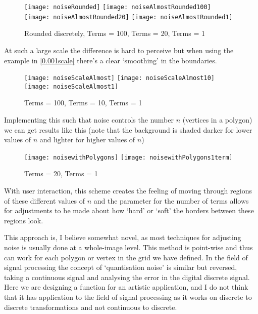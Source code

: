 \begin{figure}[H]
\centering
\texttt{[image: noiseRounded]}
\hspace{0.2cm}
\texttt{[image: noiseAlmostRounded100]}
\hspace{0.2cm}
\texttt{[image: noiseAlmostRounded20]}
\hspace{0.2cm}
\texttt{[image: noiseAlmostRounded1]}
\caption{Rounded discretely, Terms = 100, Terms = 20, Terms = 1}
\end{figure}

At such a large scale the difference is hard to perceive but when using the
example in \autoref{0.001scale} there's a clear `smoothing' in the boundaries.

\begin{figure}[H]
\centering
\texttt{[image: noiseScaleAlmost]}
\hspace{0.2cm}
\texttt{[image: noiseScaleAlmost10]}
\hspace{0.2cm}
\texttt{[image: noiseScaleAlmost1]}
\caption{Terms = 100, Terms = 10, Terms = 1}
\end{figure}

Implementing this such that noise controls the number $n$ (vertices in a
polygon) we can get results like this (note that the background is shaded darker
for lower values of $n$ and lighter for higher values of $n$)
\begin{figure}[H]
\centering
\texttt{[image: noisewithPolygons]}
\hspace{0.2cm}
\texttt{[image: noisewithPolygons1term]}
\caption{Terms = 20, Terms = 1}
\end{figure}

With user interaction, this scheme creates the feeling of moving through regions
of these different values of $n$ and the parameter for the number of terms
allows for adjustments to be made about how `hard' or `soft' the borders between
these regions look.

This approach is, I believe somewhat novel, as most techniques for adjusting
noise is usually done at a whole-image level. This method is point-wise and thus
can work for each polygon or vertex in the grid we have defined. In the field of
signal processing the concept of `quantisation noise' is similar but reversed,
taking a continuous signal and analysing the error in the digital discrete
signal. Here we are designing a function for an artistic application, and I do
not think that it has application to the field of signal processing as it works
on discrete to discrete transformations and not continuous to discrete.

